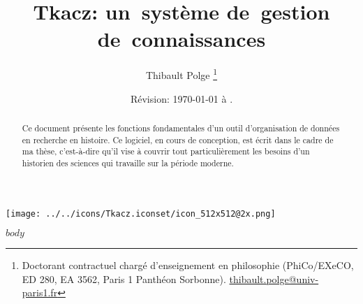 \documentclass[11pt]{article}
\begin{document}
\title{Tkacz: un~système de~gestion de~connaissances}

\author{Thibault Polge%
\thanks{Doctorant contractuel chargé d'enseignement en philosophie (PhiCo/EXeCO, ED
280, EA 3562, Paris 1 Panthéon Sorbonne). \protect\href{http://mailto:thibault.polge@univ-paris1.fr}{thibault.polge@univ-paris1.fr}%
}}

\date{Révision: \today{} à \currenttime.}

\maketitle

\begin{abstract}
Ce document présente les fonctions fondamentales d'un outil d'organisation
de données en recherche en histoire. Ce logiciel, en cours de conception,
est écrit dans le cadre de ma thèse, c'est-à-dire qu'il vise à couvrir
tout particulièrement les besoins d'un historien des sciences qui
travaille sur la période moderne.
\end{abstract}
\begin{center}\texttt{[image: ../../icons/Tkacz.iconset/icon\_512x512@2x.png]}\end{center}

\bigskip\begin{spacing}{.7}
\makeatletter
    \setcounter{tocdepth}{2}
\makeatother
\end{spacing}

\clearpage

\newcommand\chapter[1]{\part{#1}}

\newcommand\deprecated{\fbox{\textbf{OBSOLÈTE}}\hspace{1em}}

$body$
\end{document}
